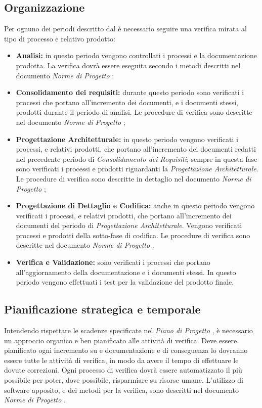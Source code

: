   \subsection{Organizzazione}
    Per ognuno dei periodi descritto dal \VersionePP{} è necessario seguire una verifica mirata al tipo di processo e relativo prodotto:
    \begin{itemize}
      \item \textbf{Analisi:} in questo periodo vengono controllati i processi e la documentazione prodotta.
      La verifica dovrà essere eseguita secondo i metodi descritti nel documento \emph{Norme di Progetto \VersioneNP{}};
      \item \textbf{Consolidamento dei requisiti:} durante questo periodo sono verificati i processi che portano all'incremento dei documenti, e i documenti stessi, prodotti durante il periodo di analisi.
      Le procedure di verifica sono descritte nel documento \emph{Norme di Progetto \VersioneNP{}};
      \item \textbf{Progettazione Architetturale:} in questo periodo vengono verificati i processi, e relativi prodotti, che portano all'incremento dei documenti redatti nel precedente periodo di \emph{Consolidamento dei Requisiti};
      sempre in questa fase sono verificati i processi e prodotti riguardanti la \emph{Progettazione Architetturale}.
      Le procedure di verifica sono descritte in dettaglio nel documento \emph{Norme di Progetto \VersioneNP{}};
      \item \textbf{Progettazione di Dettaglio e Codifica:} anche in questo periodo vengono verificati i processi, e relativi prodotti, che portano all'incremento dei documenti del periodo di \emph{Progettazione Architetturale}.
      Vengono verificati processi e prodotti della sotto-fase di codifica. Le procedure di verifica sono descritte nel documento \emph{Norme di Progetto \VersioneNP{}}.
      \item \textbf{Verifica e Validazione:} sono verificati i processi che portano all'aggiornamento della documentazione e i documenti stessi.
      In questo periodo vengono effettuati i test per la validazione del prodotto finale.
    \end{itemize}

  \subsection{Pianificazione strategica e temporale}
    Intendendo rispettare le scadenze specificate nel \emph{Piano di Progetto \VersionePP{}}, è necessario un approccio organico e ben pianificato alle attività di verifica.
    Deve essere pianificato ogni incremento su  e documentazione e di conseguenza lo dovranno essere tutte le attività di verifica,
    in modo da avere il tempo di effettuare le dovute correzioni. Ogni processo di verifica dovrà essere automatizzato il più possibile per poter, dove possibile,
    risparmiare su risorse umane. L'utilizzo di software apposito, e dei metodi per la verifica, sono descritti nel documento \emph{Norme di Progetto \VersioneNP{}}.

